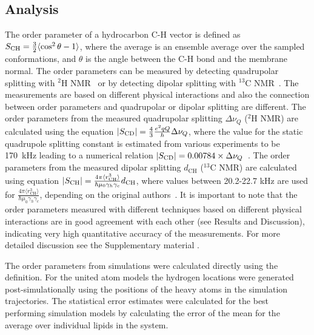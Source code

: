 \documentclass[pre,aps,floatfix,authordate1-4,twocolumn]{revtex4-1}
\begin{document}
\subsection{Analysis}
The order parameter of a hydrocarbon C-H vector is defined as $S_{{\rm CH}}=\frac{3}{2}\langle \cos^2 \theta-1 \rangle$, where
the average is an ensemble average over the sampled conformations, and $\theta$ is the angle between the C-H bond and the membrane normal.
The order parameters can be measured by detecting quadrupolar splitting with $^2$H NMR~\cite{seelig77c} or by detecting dipolar 
splitting with $^{13}$C NMR~\cite{hong95a,gross97,dvinskikh05a,ferreira13}. The measurements are based on
different physical interactions and also the connection between order parameters and quadrupolar or dipolar splitting
are different. The order parameters from the measured quadrupolar splitting $\Delta \nu_Q$ ($^2$H NMR) are calculated using 
the equation $|S_{{\rm CD}}|=\frac{4}{3} \frac{e^2qQ}{h} \Delta \nu_Q$, where the value for the static quadrupole
splitting constant is estimated from various experiments to be 170~kHz leading to a numerical relation $|S_{{\rm CD}}|=0.00784 \times \Delta \nu_Q$~\cite{seelig77c}. 
The order parameters from the measured dipolar splitting $d_\mathrm{CH}$ ($^{13}$C NMR) are calculated using equation
$|S_{{\rm CH}}|=\frac{4\pi\langle r_\mathrm{CH}^3 \rangle}{\hbar \mu_0 \gamma_h \gamma_c} d_\mathrm{CH}$, where
values between 20.2-22.7 kHz are used for $\frac{4\pi\langle r_\mathrm{CH}^3 \rangle}{\hbar \mu_0 \gamma_h \gamma_c}$,
depending on the original authors~\cite{hong95a,gross97,dvinskikh05a,ferreira13}.
It is important to note that the order parameters measured with different techniques based on different physical interactions are in good agreement
with each other (see Results and Discussion), indicating very high quantitative accuracy of the measurements.
For more detailed discussion see the Supplementary material .

The order parameters from simulations were calculated directly using the definition.
For the united atom models the hydrogen locations were generated 
post-simulationally using the positions of the heavy atoms in the simulation trajectories.
The statistical error estimates were calculated for the best performing simulation
models by calculating the error of the mean for the average over individual lipids in the system. 
\end{document}
